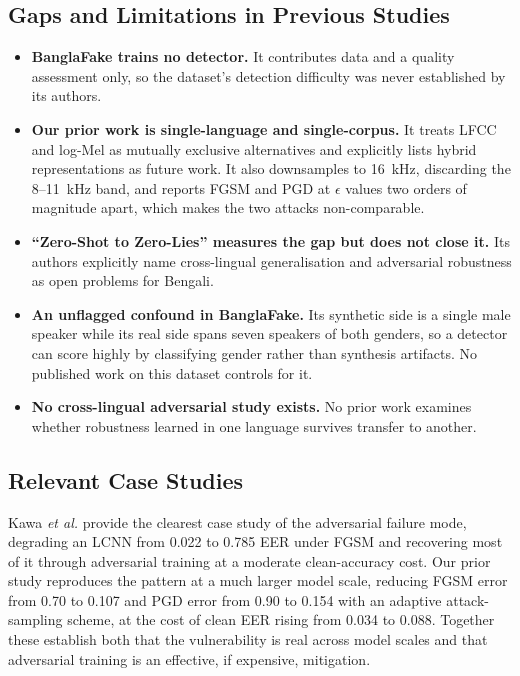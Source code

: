 \documentclass[conference]{IEEEtran}
\renewcommand{\cite}[1]{\unskip}
\begin{document}
\subsection{Gaps and Limitations in Previous Studies}
\begin{itemize}
\item \textbf{BanglaFake \cite{fahad2025banglafake} trains no detector.} It
      contributes data and a quality assessment only, so the dataset's
      detection difficulty was never established by its authors.
\item \textbf{Our prior work \cite{ahmed2026melspec} is single-language and
      single-corpus.} It treats LFCC and log-Mel as mutually exclusive
      alternatives and explicitly lists hybrid representations as future work.
      It also downsamples to 16~kHz, discarding the 8--11~kHz band, and
      reports FGSM and PGD at $\epsilon$ values two orders of magnitude apart,
      which makes the two attacks non-comparable.
\item \textbf{``Zero-Shot to Zero-Lies'' \cite{samu2025zeroshot} measures the
      gap but does not close it.} Its authors explicitly name cross-lingual
      generalisation and adversarial robustness as open problems for Bengali.
\item \textbf{An unflagged confound in BanglaFake.} Its synthetic side is a
      single male speaker while its real side spans seven speakers of both
      genders, so a detector can score highly by classifying gender rather
      than synthesis artifacts. No published work on this dataset controls
      for it.
\item \textbf{No cross-lingual adversarial study exists.} No prior work
      examines whether robustness learned in one language survives transfer
      to another.
\end{itemize}

\subsection{Relevant Case Studies}
Kawa \emph{et al.} \cite{kawa2023lcnn} provide the clearest case study of the
adversarial failure mode, degrading an LCNN from 0.022 to 0.785 EER under FGSM
and recovering most of it through adversarial training at a moderate
clean-accuracy cost. Our prior study \cite{ahmed2026melspec} reproduces the
pattern at a much larger model scale, reducing FGSM error from 0.70 to 0.107
and PGD error from 0.90 to 0.154 with an adaptive attack-sampling scheme,
at the cost of clean EER rising from 0.034 to 0.088. Together these establish
both that the vulnerability is real across model scales and that adversarial
training is an effective, if expensive, mitigation.
\end{document}
